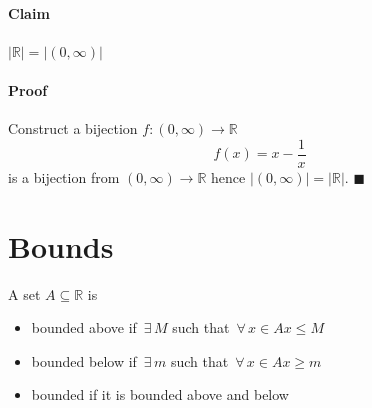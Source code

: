 \documentclass{article}
\newcommand{\bb}[1]{\mathbb{#1}}
\newcommand{\A}{\,\forall\,}
\newcommand{\E}{\,\exists\,}
\begin{document}
\paragraph{Claim} \(|\bb R|=|(0,\infty)|\)

\paragraph{Proof} Construct a bijection \(f:(0,\infty)\to\bb R\)
\[f(x)=x-\frac 1x\]
is a bijection from \((0,\infty)\to \bb R\) hence \(|(0,\infty)|=|\bb R|\). \(\blacksquare\)

\section{Bounds}

A set \(A\subseteq\bb R\) is
\begin{itemize}
\item bounded above if \(\E M\) such that \(\A x\in A x\le M\)
\item bounded below if \(\E m\) such that \(\A x\in A x\ge m\)
\item bounded if it is bounded above and below
\end{itemize}
\end{document}
